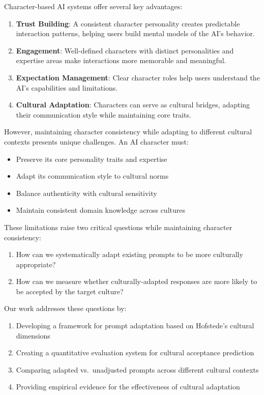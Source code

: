 \documentclass[
]{article}
\providecommand{\tightlist}{%
  \setlength{\itemsep}{0pt}\setlength{\parskip}{0pt}}
\begin{document}
Character-based AI systems offer several key advantages:

\begin{enumerate}
\def\labelenumi{\arabic{enumi}.}
\tightlist
\item
  \textbf{Trust Building}: A consistent character personality creates
  predictable interaction patterns, helping users build mental models of
  the AI's behavior.
\item
  \textbf{Engagement}: Well-defined characters with distinct
  personalities and expertise areas make interactions more memorable and
  meaningful.
\item
  \textbf{Expectation Management}: Clear character roles help users
  understand the AI's capabilities and limitations.
\item
  \textbf{Cultural Adaptation}: Characters can serve as cultural
  bridges, adapting their communication style while maintaining core
  traits.
\end{enumerate}

However, maintaining character consistency while adapting to different
cultural contexts presents unique challenges. An AI character must: 

\begin{itemize}
  \tightlist
  \item
    Preserve its core personality traits and expertise
  \item
    Adapt its communication style to cultural norms
  \item
    Balance authenticity with cultural sensitivity
  \item 
    Maintain consistent domain knowledge across cultures
  \end{itemize}

These limitations raise two critical questions while maintaining
character consistency:

\begin{enumerate}
\def\labelenumi{\arabic{enumi}.}
\tightlist
\item
  How can we systematically adapt existing prompts to be more culturally
  appropriate?
\item
  How can we measure whether culturally-adapted responses are more
  likely to be accepted by the target culture?
\end{enumerate}

Our work addresses these questions by:

\begin{enumerate}
\tightlist
\item
Developing a framework for
prompt adaptation based on Hofstede's cultural dimensions 
\item
Creating a
quantitative evaluation system for cultural acceptance prediction 
\item
Comparing adapted vs.~unadjusted prompts across different cultural
contexts 
\item
Providing empirical evidence for the effectiveness of
cultural adaptation
\end{enumerate}
\end{document}
